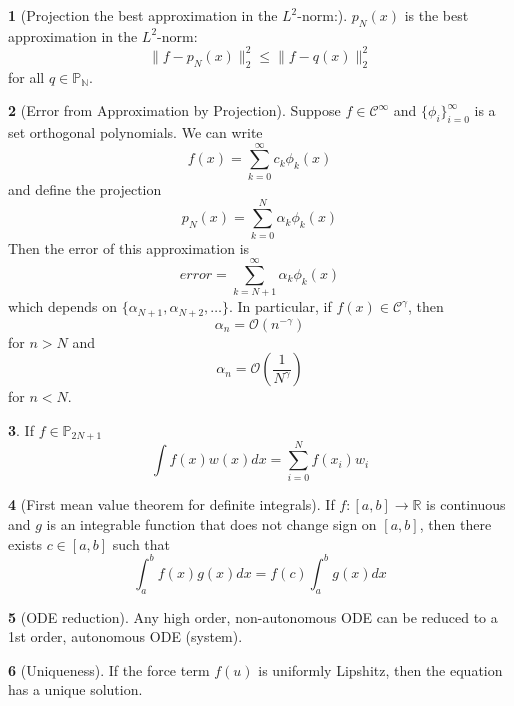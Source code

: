 \documentclass[12pt]{article}
\theoremstyle{definition}
\newtheorem{theorem}{\color{ForestGreen}{\textbf{Theorem}}}
\newcommand{\R}{\mathbb{R}}
\newcommand{\norm}[1]{\lVert#1\rVert}
\begin{document}
\begin{theorem}[Projection the best approximation in the $L^2$-norm:]
$p_N(x)$ is the best approximation in the $L^2$-norm:
\begin{equation}
\norm{f-p_N(x)}^2_2 \leq \norm{f-q(x)}^2_2
\end{equation}
for all $q \in \mathbb{P_N}$.
\end{theorem}

\begin{theorem}[Error from Approximation by Projection]
Suppose $f \in \mathcal{C}^\infty$ and $\{\phi_i\}_{i=0}^{\infty}$ is a set orthogonal polynomials. We can write
\begin{equation}
f(x) = \sum_{k=0}^\infty c_k \phi_k(x)
\end{equation}
and define the projection
\begin{equation}
p_N(x) = \sum_{k=0}^N \alpha_k \phi_k(x)
\end{equation}
Then the error of this approximation is
\begin{equation}
error = \sum_{k=N+1}^\infty \alpha_k \phi_k(x)
\end{equation}
which depends on $\{\alpha_{N+1}, \alpha_{N+2}, \ldots \}$. In particular, if $f(x) \in \mathcal{C}^\gamma$, then
\begin{equation}
\alpha_n = \mathcal{O}(n^{-\gamma})
\end{equation}
for $n > N$ and
\begin{equation}
\alpha_n = \mathcal{O}\left(\frac{1}{N^\gamma}\right)
\end{equation}
for $n < N$.
\end{theorem}

\begin{theorem}
If $f \in \mathbb{P}_{2N+1}$
\begin{equation}
\int f(x)w(x)dx = \sum_{i=0}^N f(x_i)w_i
\end{equation}
\end{theorem}

\begin{theorem}[First mean value theorem for definite integrals]
If $f:[a,b] \to \R$ is continuous and $g$ is an integrable function that does not change sign on $[a,b]$, then there exists $c \in [a,b]$ such that
\begin{equation}
\int_a^b f(x)g(x) dx = f(c)\int_a^b g(x)dx
\end{equation}
\end{theorem}

\begin{theorem}[ODE reduction]
Any high order, non-autonomous ODE can be reduced to a 1st order, autonomous ODE (system).
\end{theorem}

\begin{theorem}[Uniqueness]
If the force term $f(u)$ is uniformly Lipshitz, then the equation has a unique solution.
\end{theorem}
\end{document}
